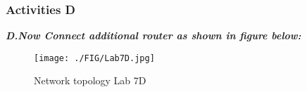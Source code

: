 \documentclass[a4paper,11pt]{article}
\begin{document}
\pagebreak


%
%
%
%

%
%
%
%
%
%
%



\subsubsection{Activities D}

{\bfseries \textit{D.Now Connect additional router as shown in figure below:}}



\begin{figure}[H]
    \centering
    \texttt{[image: ./FIG/Lab7D.jpg]}
    \caption{Network topology Lab 7D}
\end{figure}
\end{document}
